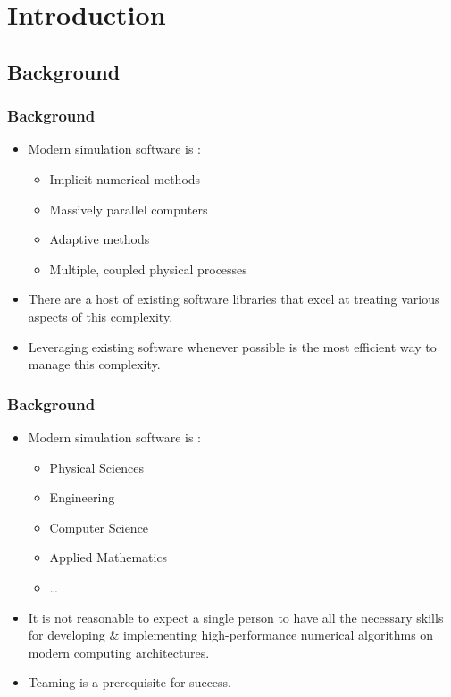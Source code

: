 \section{Introduction}

\subsection{Background}
\frame
{
  \frametitle{Background}

  \begin{itemize}
  \item Modern simulation software is :
    \begin{itemize}
    \item Implicit numerical methods
    \item Massively parallel computers
    \item Adaptive methods
    \item Multiple, coupled physical processes
    \end{itemize}
  \item There are a host of existing software libraries that excel at treating various aspects of this complexity.
  \item Leveraging existing software whenever possible is the most efficient way to manage this complexity.

  \end{itemize}
}




\frame
{
  \frametitle{Background}

  \begin{itemize}
  \item Modern simulation software is :
    \begin{itemize}
    \item Physical Sciences
    \item Engineering
    \item Computer Science
    \item Applied Mathematics
    \item \ldots
    \end{itemize}
  \item It is not reasonable to expect a single person to have all the necessary skills for developing \& implementing high-performance numerical algorithms on modern computing architectures.
  \item Teaming is a prerequisite for success.
  \end{itemize}
}




